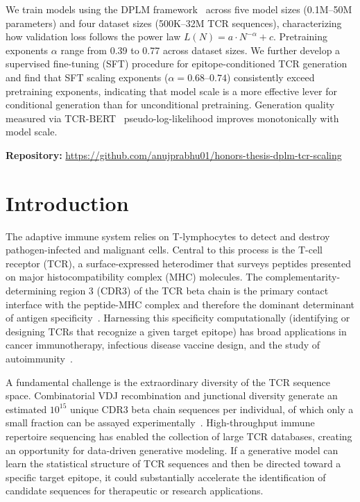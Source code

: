 \documentclass[12pt]{article}
\begin{document}
We train models using the DPLM framework~\cite{wang2024dplm} across five model
sizes (0.1M--50M parameters) and four dataset sizes (500K--32M TCR sequences),
characterizing how validation loss follows the power law $L(N) = a \cdot N^{-\alpha} + c$.
Pretraining exponents $\alpha$ range from 0.39 to 0.77 across dataset sizes. We further
develop a supervised fine-tuning (SFT) procedure for epitope-conditioned TCR generation and
find that SFT scaling exponents ($\alpha = 0.68$--$0.74$) consistently exceed pretraining
exponents, indicating that model scale is a more effective lever for conditional generation than for
unconditional pretraining. Generation quality measured via TCR-BERT~\cite{wu2021tcrbert} pseudo-log-likelihood
improves monotonically with model scale.

\begin{center}
\textbf{Repository:} \url{https://github.com/anujprabhu01/honors-thesis-dplm-tcr-scaling}
\end{center}

\newpage
\tableofcontents

\newpage
\section{Introduction}

The adaptive immune system relies on T-lymphocytes to detect and destroy
pathogen-infected and malignant cells. Central to this process is the T-cell receptor (TCR),
a surface-expressed heterodimer that surveys peptides presented on major histocompatibility
complex (MHC) molecules. The complementarity-determining region 3 (CDR3) of the TCR beta
chain is the primary contact interface with the peptide-MHC complex and therefore the dominant
determinant of antigen specificity~\cite{davis1988}. Harnessing this specificity
computationally (identifying or designing TCRs that recognize a given target epitope) has
broad applications in cancer immunotherapy, infectious disease vaccine design, and the study
of autoimmunity~\cite{june2018}.

A fundamental challenge is the extraordinary diversity of the TCR sequence space. Combinatorial
VDJ recombination and junctional diversity generate an estimated $10^{15}$ unique CDR3 beta
chain sequences per individual, of which only a small fraction can be assayed
experimentally~\cite{robins2009}. High-throughput immune repertoire sequencing has enabled the
collection of large TCR databases, creating an opportunity for data-driven generative modeling.
If a generative model can learn the statistical structure of TCR sequences and then be directed
toward a specific target epitope, it could substantially accelerate the identification of
candidate sequences for therapeutic or research applications.
\end{document}
